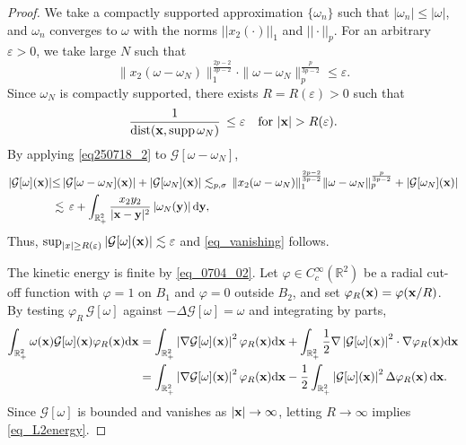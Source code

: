 \documentclass[11pt]{amsart}
\theoremstyle{definition}
\theoremstyle{definition}
\numberwithin{equation}{section}
\newcommand{\supp}{{\mathrm{supp}}\,}
\newcommand{\0}{\emptyset}
\newcommand{\bfx}{{\bf x}}
\newcommand{\bfy}{{\bf y}}
\newcommand{\bbR}{\mathbb R}
\newcommand{\calG}{\mathcal G}
\newcommand{\dd}{\mathrm{d}}
\begin{document}
	\begin{proof}
		We take a compactly supported approximation $\{\omega_n\}$ such that $|\omega_n| \le  |\omega|$, and $\omega_n$ converges to $\omega$ with the norms $||x_2(\cdot)||_1$ and $||\cdot||_p$. For an arbitrary $\varepsilon>0$, we take large $N$ such that 
		\[
		\| x_2 (\omega - \omega_N)\|_1^{\frac{2p-2}{3p-2}} \cdot \|\omega - \omega_N\|_{p}^{\frac{p}{3p-2}} \le \varepsilon.
		\]
		Since $\omega_N$ is compactly supported, there exists $R = R(\varepsilon) > 0$ such that
		\[
		\frac{1}{\operatorname{dist} (\bfx, \supp \omega_N)} \, \le \varepsilon \quad \textrm{for} \,\, |\bfx| > R(\varepsilon).
		\]
		By applying \eqref{eq250718_2} to $\calG[\omega - \omega_N]$,
		\begin{align*}
			\left| \calG[\omega](\bfx) \right| &{\leq} \left| \calG[\omega - \omega_N](\bfx) \right| + \left| \calG[\omega_N](\bfx) \right| 
			\lesssim_{p, \sigma} \, \|x_2(\omega - \omega_N)\|_{1}^{\frac{2p-2}{3p-2}}\|\omega - \omega_N\|_{p}^{\frac{p}{3p-2}}  + \left| \calG[\omega_N](\bfx) \right| \\
			&\lesssim \, \varepsilon  + \int_{\bbR^2_+} \frac{x_2y_2}{|\bfx - \bfy|^2}  \left| \omega_N(\bfy) \right| \dd\bfy,
		\end{align*}
		Thus, $\sup_{|x|\geq R(\varepsilon)} | \calG[\omega](\bfx) | \lesssim  \varepsilon$ and \eqref{eq_vanishing} follows.
		
		
		
		The kinetic energy is finite by \eqref{eq_0704_02}. Let $\varphi\in C_c^\infty(\bbR^2)$ be a radial cut-off function with $\varphi=1$ on $B_1$ and $\varphi=0$ outside $B_2$, and set $\varphi_R(\bfx)=\varphi(\bfx/R)$. By testing $ \varphi_R\,\calG[\omega]$ against $-\Delta \calG[\omega] = \omega$ and integrating by parts, 
		\begin{align*}
			\int_{\bbR^2_+}  \omega(\bfx) \calG[\omega](\bfx) \varphi_R(\bfx) \dd  \bfx    &= \int_{\bbR^2_+}   \left| \nabla\calG[\omega](\bfx) \right|^2 \varphi_R(\bfx) \dd  \bfx + \int_{\bbR^2_+} \frac{1}{2} \nabla \left|\calG[\omega](\bfx)\right|^2 \cdot \nabla \varphi_R(\bfx) \dd \bfx \\
			&=\int_{\bbR^2_+}   \left| \nabla\calG[\omega](\bfx) \right|^2 \varphi_R(\bfx) \dd  \bfx - \frac{1}{2}\int_{\bbR^2_+} \left|\calG[\omega](\bfx) \right|^2 \Delta \varphi_R(\bfx) \,\dd \bfx.
		\end{align*}
		Since $\calG[\omega]$ is bounded and vanishes as $|\bfx| \to \infty$, letting $R \to \infty$ implies \eqref{eq_L2energy}.
	\end{proof}
	
\end{document}

